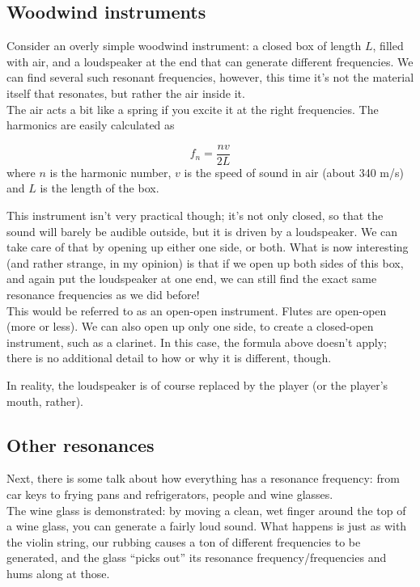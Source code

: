 \subsection{Woodwind instruments}

Consider an overly simple woodwind instrument: a closed box of length $L$, filled with air, and a loudspeaker at the end that can generate different frequencies. We can find several such resonant frequencies, however, this time it's not the material itself that resonates, but rather the air inside it.\\
The air acts a bit like a spring if you excite it at the right frequencies. The harmonics are easily calculated as

\begin{equation}
f_n = \frac{n v}{2 L}
\end{equation}
where $n$ is the harmonic number, $v$ is the speed of sound in air (about 340 m/s) and $L$ is the length of the box.

This instrument isn't very practical though; it's not only closed, so that the sound will barely be audible outside, but it is driven by a loudspeaker. We can take care of that by opening up either one side, or both. What is now interesting (and rather strange, in my opinion) is that if we open up both sides of this box, and again put the loudspeaker at one end, we can still find the exact same resonance frequencies as we did before!\\
This would be referred to as an open-open instrument. Flutes are open-open (more or less).
We can also open up only one side, to create a closed-open instrument, such as a clarinet. In this case, the formula above doesn't apply; there is no additional detail to how or why it is different, though.

In reality, the loudspeaker is of course replaced by the player (or the player's mouth, rather).

\subsection{Other resonances}

Next, there is some talk about how everything has a resonance frequency: from car keys to frying pans and refrigerators, people and wine glasses.\\
The wine glass is demonstrated: by moving a clean, wet finger around the top of a wine glass, you can generate a fairly loud sound. What happens is just as with the violin string, our rubbing causes a ton of different frequencies to be generated, and the glass ``picks out'' its resonance frequency/frequencies and hums along at those.

